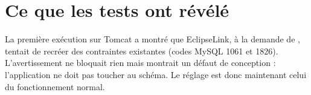 
\section{Ce que les tests ont révélé}
La première exécution sur Tomcat a montré que EclipseLink, à la demande de , tentait de recréer des
contraintes existantes (codes MySQL 1061 et 1826). L'avertissement ne bloquait rien mais montrait un défaut de conception :
l'application ne doit pas toucher au schéma. Le réglage  est donc maintenant celui du fonctionnement normal.
